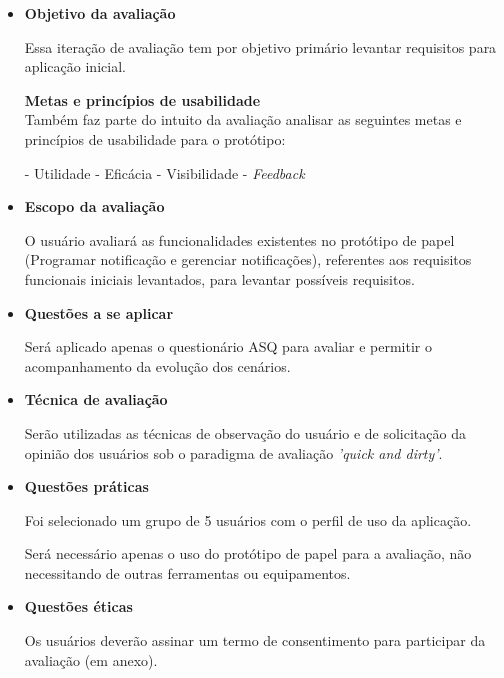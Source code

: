 	  \begin{itemize}
	   \item \textbf{Objetivo da avaliação}
	      
	      \subitem Essa iteração de avaliação tem por objetivo primário levantar requisitos para aplicação inicial.
	      
	      \subitem \textbf{Metas e princípios de usabilidade}\\
		Também faz parte do intuito da avaliação analisar as seguintes metas e princípios de usabilidade para o protótipo:
		
		\subsubitem - Utilidade
		\subsubitem - Eficácia
		\subsubitem - Visibilidade
		\subsubitem - \textit{Feedback}
	    
	   \item \textbf{Escopo da avaliação}
	      
	      \subitem 
		O usuário avaliará as funcionalidades existentes no protótipo de papel 
		(Programar notificação e gerenciar notificações), referentes aos requisitos funcionais iniciais levantados,
		para levantar possíveis requisitos.
	      
	   \item \textbf{Questões a se aplicar}
	      
	      \subitem Será aplicado apenas o questionário ASQ para avaliar e permitir o acompanhamento da evolução dos cenários.
	      
	   \item \textbf{Técnica de avaliação}
	      
	      \subitem 
		Serão utilizadas as técnicas de observação do usuário e de solicitação da opinião dos usuários
		sob o paradigma de avaliação \textit{'quick and dirty'}.
	      
	   \item \textbf{Questões práticas}
	      
	      \subitem Foi selecionado um grupo de 5 usuários com o perfil de uso da aplicação.
	      
	      \subitem Será necessário apenas o uso do protótipo de papel para a avaliação, não
		necessitando de outras ferramentas ou equipamentos.
	      
	   \item \textbf{Questões éticas}
	      
	      \subitem 
		Os usuários deverão assinar um termo de consentimento para participar da avaliação (em anexo).
	      
	  \end{itemize}
	
